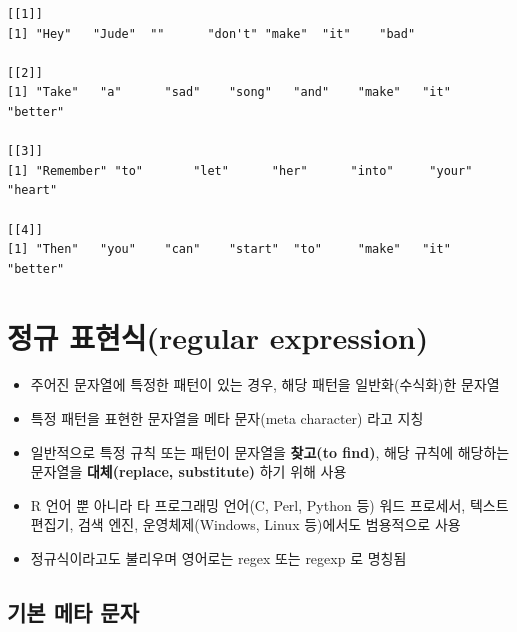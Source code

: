 \documentclass[
  11pt,
]{krantz}
\begin{document}
\begin{verbatim}
[[1]]
[1] "Hey"   "Jude"  ""      "don't" "make"  "it"    "bad"  

[[2]]
[1] "Take"   "a"      "sad"    "song"   "and"    "make"   "it"     "better"

[[3]]
[1] "Remember" "to"       "let"      "her"      "into"     "your"     "heart"   

[[4]]
[1] "Then"   "you"    "can"    "start"  "to"     "make"   "it"     "better"
\end{verbatim}

\normalsize

\hypertarget{reg-exp}{%
\section{정규 표현식(regular expression)}\label{reg-exp}}

\begin{itemize}
\item
  주어진 문자열에 특정한 패턴이 있는 경우, 해당 패턴을 일반화(수식화)한 문자열
\item
  특정 패턴을 표현한 문자열을 메타 문자(meta character) 라고 지칭
\item
  일반적으로 특정 규칙 또는 패턴이 문자열을 \textbf{찾고(to find)}, 해당 규칙에 해당하는 문자열을 \textbf{대체(replace, substitute)} 하기 위해 사용
\item
  R 언어 뿐 아니라 타 프로그래밍 언어(C, Perl, Python 등) 워드 프로세서, 텍스트 편집기, 검색 엔진, 운영체제(Windows, Linux 등)에서도 범용적으로 사용
\item
  정규식이라고도 불리우며 영어로는 regex 또는 regexp 로 명칭됨
\end{itemize}

\hypertarget{basic-meta}{%
\subsection{기본 메타 문자}\label{basic-meta}}

\footnotesize
\end{document}
